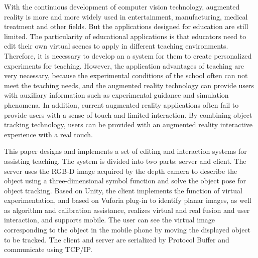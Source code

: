\begin{englishabstract}
With the continuous development of computer vision technology, augmented reality is more and more widely used in entertainment, manufacturing, medical treatment and other fields. But the applications designed for education are still limited. The particularity of educational applications is that educators need to edit their own virtual scenes to apply  in different teaching environments. Therefore, it is necessary to develop an a system for them to create personalized experiments for teaching. However, the application advantages of teaching are very necessary, because the experimental conditions of the school often can not meet the teaching needs, and the augmented reality technology can provide users with auxiliary information such as experimental guidance and simulation phenomena. In addition, current augmented reality applications often fail to provide users with a sense of touch and limited interaction. By combining object tracking technology, users can be provided with an augmented reality interactive experience with a real touch.

This paper designs and implements a set of editing and interaction systems for assisting teaching. The system is divided into two parts: server and client. The server uses the RGB-D image acquired by the depth camera to describe the object using a three-dimensional symbol function and solve the object pose for object tracking. Based on Unity, the client implements the function of virtual experimentation, and based on Vuforia plug-in to identify planar images, as well as algorithm and calibration assistance, realizes virtual and real fusion and user interaction, and supports mobile. The user can see the virtual image corresponding to the object in the mobile phone by moving the displayed object to be tracked. The client and server are serialized by Protocol Buffer and communicate using TCP/IP.

 
\end{englishabstract}

